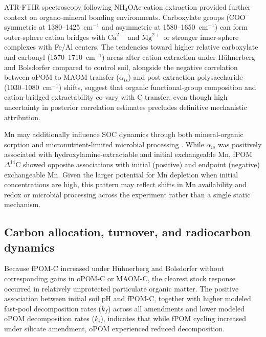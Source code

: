 \documentclass[preprint,12pt]{elsarticle}
\begin{document}
ATR-FTIR spectroscopy following NH$_4$OAc cation extraction provided further context on organo-mineral bonding environments. Carboxylate groups ($\mathrm{COO}^{-}$ symmetric at 1380--1425~cm$^{-1}$ and asymmetric at 1580--1650~cm$^{-1}$) can form outer-sphere cation bridges with $\mathrm{Ca}^{2+}$ and $\mathrm{Mg}^{2+}$ or stronger inner-sphere complexes with Fe/Al centers. The tendencies toward higher relative carboxylate and carbonyl (1570--1710~cm$^{-1}$) areas after cation extraction under H\"uhnerberg and Bolsdorfer compared to control soil, alongside the negative correlation between oPOM-to-MAOM transfer ($\alpha_{is}$) and post-extraction polysaccharide (1030--1080~cm$^{-1}$) shifts, suggest that organic functional-group composition and cation-bridged extractability co-vary with C transfer, even though high uncertainty in posterior correlation estimates precludes definitive mechanistic attribution.

Mn may additionally influence SOC dynamics through both mineral-organic sorption and micronutrient-limited microbial processing \citep{kleber2021dynamic,paulus2024manganese,Watanabe2023}. While $\alpha_{is}$ was positively associated with hydroxylamine-extractable and initial exchangeable Mn, fPOM $\Delta^{14}$C showed opposite associations with initial (positive) and endpoint (negative) exchangeable Mn. Given the larger potential for Mn depletion when initial concentrations are high, this pattern may reflect shifts in Mn availability and redox or microbial processing across the experiment rather than a single static mechanism.

\subsection{Carbon allocation, turnover, and radiocarbon dynamics}
\label{subsec:carbon_allocation}

Because fPOM-C increased under H\"uhnerberg and Bolsdorfer without corresponding gains in oPOM-C or MAOM-C, the clearest stock response occurred in relatively unprotected particulate organic matter. The positive association between initial soil pH and fPOM-C, together with higher modeled fast-pool decomposition rates ($k_f$) across all amendments and lower modeled oPOM decomposition rates ($k_i$), indicates that while fPOM cycling increased under silicate amendment, oPOM experienced reduced decomposition.
\end{document}
